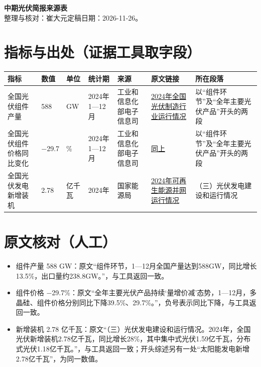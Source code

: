 \documentclass[UTF8,11pt]{ctexart}
\begin{document}
\begin{center}
  {\Large\bfseries 中期光伏简报来源表}\\[0.35em]
  整理与核对：崔大元\quad 定稿日期：2026-11-26。
\end{center}

\section*{指标与出处（证据工具取字段）}

{\footnotesize
\setlength{\tabcolsep}{4pt}
\begin{tabularx}{\textwidth}{@{}p{1.9cm}p{1.0cm}p{1.1cm}p{1.5cm}YYY@{}}
\toprule
指标 & 数值 & 单位 & 统计期 & 来源 & 原文链接 & 所在段落\\
\midrule
全国光伏组件产量 & 588 & GW & 2024年1—12月 & 工业和信息化部电子信息司 &
\href{https://wap.miit.gov.cn/gyhxxhb/jgsj/dzxxsnew/xyyx/art/2025/art_1717bf6fa0a34311a2c347fb9623e607.html}{2024年全国光伏制造行业运行情况} &
以“组件环节”及“全年主要光伏产品”开头的两段\\
\addlinespace[2pt]
全国光伏组件价格同比变化 & −29.7 & \% & 2024年1—12月 & 工业和信息化部电子信息司 &
\href{https://wap.miit.gov.cn/gyhxxhb/jgsj/dzxxsnew/xyyx/art/2025/art_1717bf6fa0a34311a2c347fb9623e607.html}{同上} &
以“组件环节”及“全年主要光伏产品”开头的两段\\
\addlinespace[2pt]
全国光伏发电新增装机 & 2.78 & 亿千瓦 & 2024年 & 国家能源局 &
\href{https://www.nea.gov.cn/20250221/e10f363cabe3458aaf78ba4558970054/c.html}{2024年可再生能源并网运行情况} &
（三）光伏发电建设和运行情况\\
\bottomrule
\end{tabularx}
}

\section*{原文核对（人工）}

\begin{itemize}
  \setlength{\itemsep}{0.35em}
  \item 组件产量 588 GW：原文“组件环节，1—12月全国产量达到588GW，同比增长13.5\%，出口量约238.8GW。”，与工具返回一致。
  \item 组件价格 −29.7\%：原文“全年主要光伏产品持续‘量增价减’态势，1—12月，多晶硅、组件价格分别同比下降39.5\%、29.7\%。”，负号表示同比下降，与工具返回一致。
  \item 新增装机 2.78 亿千瓦：原文“（三）光伏发电建设和运行情况。2024年，全国光伏新增装机2.78亿千瓦，同比增长28\%，其中集中式光伏1.59亿千瓦，分布式光伏1.18亿千瓦。”，与工具返回一致；开头综述另有一处“太阳能发电新增2.78亿千瓦”，为同一数值。
\end{itemize}
\end{document}
